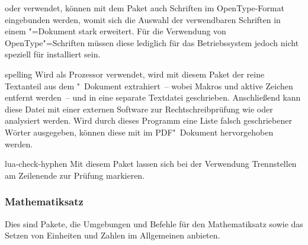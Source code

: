 \begin{packages}
  oder  verwendet, können mit dem Paket  
  auch Schriften im OpenType-Format eingebunden werden, womit sich die Auswahl 
  der verwendbaren Schriften in einem "=Dokument stark erweitert. 
  Für die Verwendung von OpenType"=Schriften müssen diese lediglich für das 
  Betriebssystem jedoch nicht speziell für  installiert sein.
\item[spelling]
  Wird  als Prozessor verwendet, wird mit diesem Paket der 
  reine Textanteil aus dem "~Dokument extrahiert~-- wobei Makros 
  und aktive Zeichen entfernt werden~-- und in eine separate Textdatei 
  geschrieben. Anschließend kann diese Datei mit einer externen Software zur 
  Rechtschreibprüfung wie  oder  
  analysiert werden. Wird durch dieses Programm eine Liste falsch geschriebener 
  Wörter ausgegeben, können diese mit  im PDF"~Dokument 
  hervorgehoben werden.
\item[lua-check-hyphen]
  Mit diesem Paket lassen sich bei der Verwendung  
  Trennstellen am Zeilenende zur Prüfung markieren.
\end{packages}

\subsubsection{Mathematiksatz}
Dies sind Pakete, die Umgebungen und Befehle für den Mathematiksatz sowie das 
Setzen von Einheiten und Zahlen im Allgemeinen anbieten.

